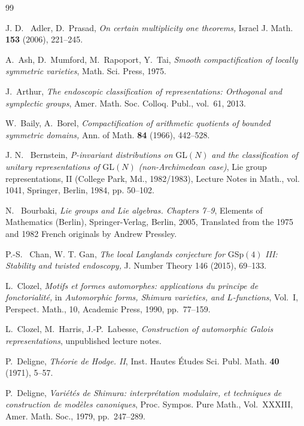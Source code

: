 \documentclass[12pt]{amsart}
\theoremstyle{definition}
\begin{document}
\begin{thebibliography}{99}


J. D. ~Adler, D.~Prasad, \textit{On certain multiplicity one theorems,} Israel J.
Math. \textbf{153} (2006), 221–245.

A.~Ash, D.~Mumford, M.~Rapoport, Y.~Tai, \emph{Smooth compactification of locally symmetric varieties}, Math. Sci. Press, 1975.

J.~Arthur, \emph{The endoscopic classification of representations: Orthogonal and symplectic groups}, Amer. Math. Soc. Colloq. Publ., vol.~61, 2013.

W.~Baily, A.~Borel, \textit{Compactification of arithmetic quotients of bounded symmetric domains,}  {Ann. of Math.} \textbf{84} (1966), 442--528.

J. N. ~Bernstein, \textit{P-invariant distributions on} GL$(N)$ \textit{and the classification of unitary representations of} GL$(N)$ \textit{(non-Archimedean case)}, Lie group representations, II
(College Park, Md., 1982/1983), Lecture Notes in Math., vol. 1041, Springer, Berlin,
1984, pp. 50–102.

N. ~Bourbaki, \textit{Lie groups and Lie algebras. Chapters 7–9}, Elements of Mathematics
(Berlin), Springer-Verlag, Berlin, 2005, Translated from the 1975 and 1982 French
originals by Andrew Pressley.

 P.-S. ~Chan, W. T. Gan, \textit{The local Langlands conjecture for} GSp$(4)$ \textit{III:
Stability and twisted endoscopy,} J. Number Theory 146 (2015), 69–133.




L.~Clozel, \textit{Motifs et formes automorphes: applications du principe de fonctorialité,} in \emph{Automorphic forms, Shimura varieties, and $L$-functions}, Vol.~I, Perspect. Math., 10, Academic Press, 1990, pp.~77--159.

L.~Clozel, M.~Harris, J.-P.~Labesse, \emph{Construction of automorphic Galois representations}, unpublished lecture notes.

P.~Deligne,\textit{ Théorie de Hodge. II},  {Inst. Hautes Études Sci. Publ. Math.} \textbf{40} (1971), 5--57.

P.~Deligne, \textit{Variétés de Shimura: interprétation modulaire, et techniques de construction de modèles canoniques}, {Proc. Sympos. Pure Math.}, Vol.~XXXIII, Amer. Math. Soc., 1979, pp.~247--289.


\end{thebibliography}
\end{document}
